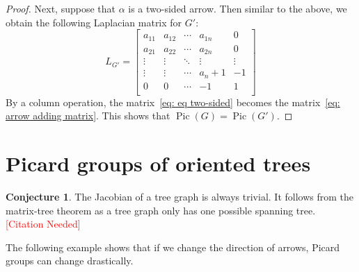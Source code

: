 \documentclass[11pt,reqno]{amsart}
\DeclareMathOperator{\Pic}{Pic}
\theoremstyle{definition}
\newtheorem{conj}[mydef]{\textbf{Conjecture}}
\theoremstyle{plain}
\begin{document}
\begin{proof}
		Next, suppose that $\alpha$ is a two-sided arrow. Then similar to the above, we obtain the following Laplacian matrix for $G'$:
		\begin{equation}\label{eq: eq two-sided}
			L_{G'}=\left[\begin{array}{ccc|c|c}
				a_{11}&a_{12}&\cdots &a_{1n}&0\\
				a_{21}&a_{22}&\cdots &a_{2n}&0\\
				\vdots & \vdots &\ddots & \vdots & \vdots \\ \hline
				\vdots & \vdots & \cdots&a_n+1 & -1\\ \hline
				0&0&\cdots &-1&1\\
			\end{array}\right]
		\end{equation}
		By a column operation, the matrix~\eqref{eq: eq two-sided} becomes the matrix~\eqref{eq: arrow adding matrix}.
		This shows that $\Pic(G)=\Pic(G')$.
	\end{proof}

\section{Picard groups of oriented trees}

\begin{conj}
	The Jacobian of a tree graph is always trivial. 
	It follows from the matrix-tree theorem as a tree graph only has one possible spanning tree. \textcolor{red}{[Citation Needed]}
\end{conj}

The following example shows that if we change the direction of arrows, Picard groups can change drastically.
\end{document}
